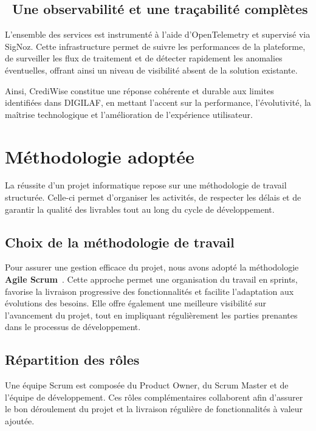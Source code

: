 \subsection*{~Une observabilité et une traçabilité complètes}

L'ensemble des services est instrumenté à l'aide d'OpenTelemetry et supervisé via SigNoz.
Cette infrastructure permet de suivre les performances de la plateforme, de surveiller les
flux de traitement et de détecter rapidement les anomalies éventuelles, offrant ainsi un
niveau de visibilité absent de la solution existante.

Ainsi, CrediWise constitue une réponse cohérente et durable aux limites identifiées dans
DIGILAF, en mettant l'accent sur la performance, l'évolutivité, la maîtrise technologique
et l'amélioration de l'expérience utilisateur.


\section{Méthodologie adoptée}

La réussite d'un projet informatique repose sur une méthodologie de travail structurée.
Celle-ci permet d'organiser les activités, de respecter les délais et de garantir la qualité
des livrables tout au long du cycle de développement.



\subsection{Choix de la méthodologie de travail}

Pour assurer une gestion efficace du projet, nous avons adopté la méthodologie
\textbf{Agile Scrum}~\cite{BocasayScrum}. Cette approche permet une organisation du travail
en sprints, favorise la livraison progressive des fonctionnalités et facilite l'adaptation
aux évolutions des besoins. Elle offre également une meilleure visibilité sur l'avancement
du projet, tout en impliquant régulièrement les parties prenantes dans le processus de
développement.

\subsection{Répartition des rôles}

Une équipe Scrum est composée du Product Owner, du Scrum Master et de l'équipe de
développement. Ces rôles complémentaires collaborent afin d'assurer le bon déroulement
du projet et la livraison régulière de fonctionnalités à valeur ajoutée.

